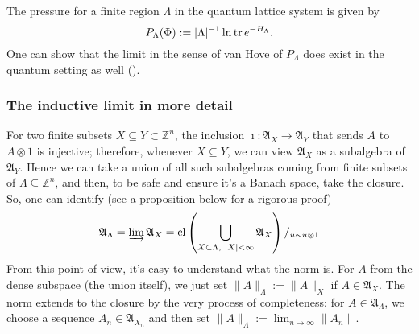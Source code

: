 The pressure for a finite region $\Lambda$ in the quantum lattice system is given by
\[
P_{\Lambda}(\Phi) := |\Lambda|^{-1} \ln \operatorname{tr} e^{-H_{\Lambda}}.
\]
One can show that the limit in the sense of van Hove of $P_{\Lambda}$ does exist in the quantum setting as well (\cite{israel}).

%
\subsubsection{The inductive limit in more detail}
For two finite subsets $X \subseteq Y \subset \mathbb Z^n$, the inclusion $\imath : \mathfrak A_{X} \rightarrow \mathfrak A_{Y}$ that sends $A$ to $A \otimes 1$ is injective; therefore, whenever $X \subseteq Y$, we can view $\mathfrak A_{X}$ as a subalgebra of $\mathfrak A_{Y}$. Hence we can take a union of all such subalgebras coming from finite subsets of $\Lambda \subseteq \mathbb Z^n$, and then, to be safe and ensure it's a Banach space, take the closure. So, one can identify (see a proposition below for a rigorous proof)
\[
\mathfrak A_{\Lambda} = \varinjlim \mathfrak A_{X} = \operatorname{cl} \left(\bigcup_{X \subset \Lambda, \ |X| < \infty} \mathfrak A_{X}\right)/_{u \sim u \otimes 1}
\]
From this point of view, it's easy to understand what the norm is. For $A$ from the dense subspace (the union itself), we just set $\|A\|_{\Lambda} := \|A\|_{X}$ if $A \in \mathfrak A_{X}$. The norm extends to the closure by the very process of completeness: for $A \in \mathfrak A_{\Lambda}$, we choose a sequence $A_n \in \mathfrak A_{X_n}$ and then set $\|A\|_{\Lambda} := \lim_{n \rightarrow \infty} \|A_n\|$.

